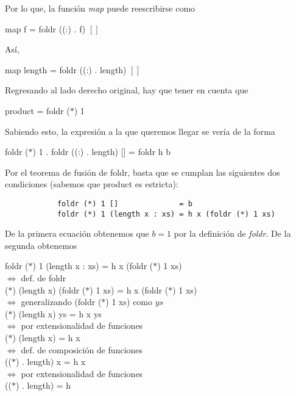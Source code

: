 \documentclass[letterpaper,11pt]{article}
\begin{document}
\begin{enumerate}
\begin{itemize}
        Por lo que, la función \textit{map} puede reescribirse como 
        \begin{center}
            map f = foldr ((:) . f) $[]$
        \end{center}
        
        Así,
        \begin{center}
            map length = foldr ((:) . length) $[]$
        \end{center}
        
        Regresando al lado derecho original, hay que tener en cuenta que 
        \begin{center}
            product = foldr ($*$) 1
        \end{center}
        
        Sabiendo esto, la expresión a la que queremos llegar se vería de la 
        forma
        \begin{center}
            foldr ($*$) 1 . foldr ((:) . length) [] = foldr h b 
        \end{center}
        
        Por el teorema de fusión de foldr, basta que se cumplan las siguientes
        dos condiciones (sabemos que product es estricta):
        \begin{lstlisting}
            foldr (*) 1 []              = b
            foldr (*) 1 (length x : xs) = h x (foldr (*) 1 xs)
        \end{lstlisting}
        
        De la primera ecuación obtenemos que $b = 1$ por la definición de 
        \textit{foldr}. De la segunda obtenemos
        \begin{center}
            foldr ($*$) 1 (length x : xs) = h x (foldr ($*$) 1 xs) \\
            $\Leftrightarrow$  def. de foldr \\
            ($*$) (length x) (foldr ($*$) 1 xs) = h x (foldr ($*$) 1 xs) \\
            $\Leftrightarrow$ generalizando (foldr ($*$) 1 xs) como $ys$\\ 
            ($*$) (length x) ys = h x ys \\
            $\Leftrightarrow$ por extensionalidad de funciones \\
            ($*$) (length x) = h x \\
            $\Leftrightarrow$ def. de composición de funciones \\
            (($*$) . length) x = h x \\
            $\Leftrightarrow$ por extensionalidad de funciones \\
            (($*$) . length) = h
        \end{center}
        

\end{itemize}
\end{enumerate}
\end{document}
